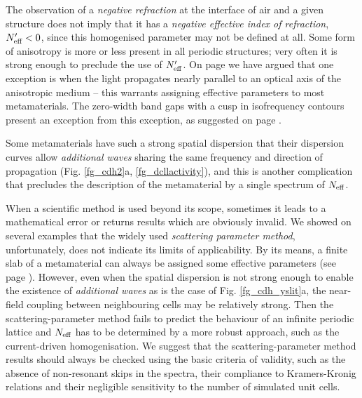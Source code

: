 The observation of a \textit{negative refraction} at the interface of air and a given structure does not imply that it has a \textit{negative effective index of refraction}, $N_{\text{eff} }'<0$, since this homogenised parameter may not be defined at all. Some form of anisotropy is more or less present in all periodic structures; very often it is strong enough to preclude the use of $N_{\text{eff} }'$. On page \pageref{indexofrefraction} we have argued that one exception is when the light propagates nearly parallel to an optical axis of the anisotropic medium -- this warrants assigning effective parameters to most metamaterials. The zero-width band gaps with a cusp in isofrequency contours present an exception from this exception, as suggested on page \pageref{diracpoint}. 

Some metamaterials have such a strong spatial dispersion that their dispersion curves allow \textit{additional waves} sharing the same frequency and direction of propagation (Fig. \ref{fg_cdh2}a, \ref{fg_dcllactivity}), and this is another complication that precludes the description of the metamaterial by a single spectrum of $N_{\text{eff} }$. 

When a scientific method is used beyond its scope, sometimes it leads to a mathematical error or returns results which are obviously invalid. We showed on several examples that the widely used \textit{scattering parameter method}, unfortunately, does not indicate its limits of applicability. By its means, a finite slab of a metamaterial can always be assigned some effective parameters (see page \pageref{sparamweaknesses}). However, even when the spatial dispersion is not strong enough to enable the existence of \textit{additional waves} as is the case of Fig. \ref{fg_cdh_yslit}a, the near-field coupling between neighbouring cells may be relatively strong. Then the scattering-parameter method fails to predict the behaviour of an infinite periodic lattice and $N_{\text{eff} }$ has to be determined by a more robust approach, such as the current-driven homogenisation. We suggest that the scattering-parameter method results should always be checked using the basic criteria of validity, such as the absence of non-resonant skips in the spectra, their compliance to Kramers-Kronig relations and their negligible sensitivity to the number of simulated unit cells.


